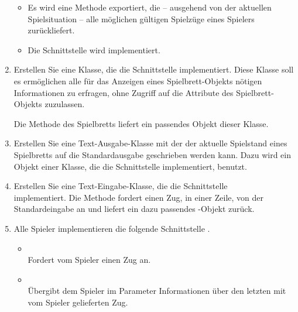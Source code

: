\begin{enumerate}
\begin{itemize}
\item Es wird eine Methode exportiert, die -- ausgehend von der aktuellen Spielsituation -- alle möglichen gültigen Spielzüge eines Spielers zurückliefert.
\item Die Schnittstelle  wird implementiert.
%
\end{itemize}
\item Erstellen Sie eine Klasse, die die Schnittstelle  implementiert.
%
Diese Klasse soll es ermöglichen alle für das Anzeigen eines Spielbrett-Objekts nötigen Informationen zu erfragen, ohne Zugriff auf die Attribute des Spielbrett-Objekts zuzulassen.

Die Methode  des Spielbretts liefert ein passendes Objekt dieser Klasse.
\item Erstellen Sie eine Text-Ausgabe-Klasse mit der der aktuelle Spielstand eines Spielbretts auf die Standardausgabe geschrieben werden kann. Dazu wird ein Objekt einer Klasse, die die Schnittstelle  implementiert, benutzt.
\item Erstellen Sie eine Text-Eingabe-Klasse, die die Schnittstelle \\  implementiert.
%
Die Methode  fordert einen Zug, in einer Zeile, von der Standardeingabe an und liefert ein dazu passendes -Objekt zurück.
\item Alle Spieler implementieren die folgende Schnittstelle .

\begin{itemize}[leftmargin=4em]
\item[\code{request}] \hfill \\Fordert vom Spieler einen Zug an.
\item[\code{confirm}] \hfill \\Übergibt dem Spieler im Parameter  Informationen über den letzten mit  vom Spieler gelieferten Zug.


\end{itemize}
\end{enumerate}
